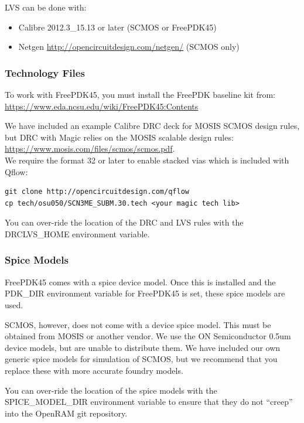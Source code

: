 LVS can be done with:
\begin{itemize}
\item Calibre 2012.3\_15.13 or later (SCMOS or FreePDK45)
\item Netgen \url{http://opencircuitdesign.com/netgen/} (SCMOS only)
\end{itemize}

\subsubsection{Technology Files}

To work with FreePDK45, you must install the FreePDK baseline kit from:\\
\url{https://www.eda.ncsu.edu/wiki/FreePDK45:Contents}

We have included an example Calibre DRC deck for MOSIS SCMOS design
rules, but DRC with Magic relies on the MOSIS scalable design
rules:\\
\url{https://www.mosis.com/files/scmos/scmos.pdf}.\\
We require the format 32 or later to enable stacked vias which is
included with Qflow:
\begin{verbatim}
git clone http://opencircuitdesign.com/qflow
cp tech/osu050/SCN3ME_SUBM.30.tech <your magic tech lib>
\end{verbatim}

You can over-ride the location of the DRC and LVS rules with the
DRCLVS\_HOME environment variable.

\subsubsection{Spice Models}

FreePDK45 comes with a spice device model. Once this is installed and
the PDK\_DIR environment variable for FreePDK45 is set, these spice
models are used.

SCMOS, however, does not come with a device spice model. This must be
obtained from MOSIS or another vendor. We use the ON Semiconductor
0.5um device models, but are unable to distribute them. We have included our
own generic spice models for simulation of SCMOS, but we recommend that
you replace these with more accurate foundry models.

You can over-ride the location of the spice models with the
SPICE\_MODEL\_DIR environment variable to ensure that they do not
``creep'' into the OpenRAM git repository.



